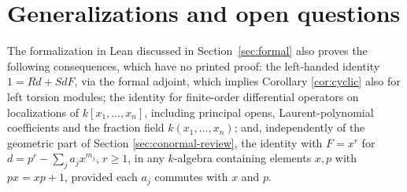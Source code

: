\documentclass[pdflatex,sn-mathphys-num]{sn-jnl}
\numberwithin{equation}{section}
\theoremstyle{thmstyleone}
\theoremstyle{thmstyletwo}
\begin{document}
\section{Generalizations and open questions}\label{sec:generalizations}
The formalization in Lean discussed in Section~\ref{sec:formal} also proves the following consequences, which have no printed proof: the left-handed identity $1=Rd+SdF$, via the
formal adjoint, which implies Corollary \ref{cor:cyclic} also for left torsion modules; the identity for finite-order differential operators on localizations of $k[x_1,\dots,x_n]$, including principal opens,
Laurent-polynomial coefficients and the fraction field $k(x_1,\dots,x_n)$; and, independently
of the geometric part of Section \ref{sec:conormal-review}, the identity with $F=x^r$ for
$d=p^r-\sum_j a_jx^{m_j}$, $r\ge1$, in any $k$-algebra containing elements
$x,p$ with $px=xp+1$, provided each $a_j$ commutes with $x$ and $p$.
\end{document}
